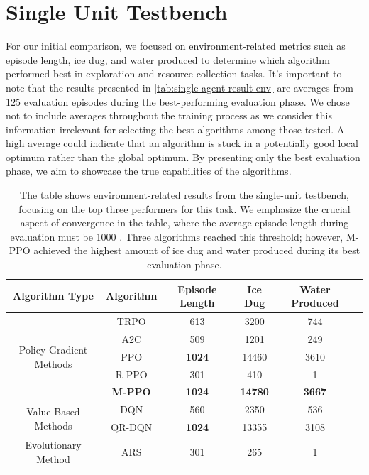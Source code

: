 \section{Single Unit Testbench}
\label{sec:single-unit-testbench-results}

\noindent For our initial comparison, we focused on environment-related metrics such as episode length, ice dug, and water produced to determine which algorithm performed best in exploration and resource collection tasks. It's important to note that the results presented in \textcolor{deepblue}{\autoref{tab:single-agent-result-env}} are averages from $125$ evaluation episodes during the best-performing evaluation phase. We chose not to include averages throughout the training process as we consider this information irrelevant for selecting the best algorithms among those tested. A high average could indicate that an algorithm is stuck in a potentially good local optimum rather than the global optimum. By presenting only the best evaluation phase, we aim to showcase the true capabilities of the algorithms.

\bigskip

\begin{table}[htbp]
    \centering
    \begin{tabular}{|c|c|c|c|c|c|}
        \hline
        \textbf{Algorithm Type} & \textbf{Algorithm} & \textbf{Episode Length} & \textbf{Ice Dug} & \textbf{Water Produced}\\
        \hline
        \multirow{5}{*}{Policy Gradient Methods} & TRPO  & 613  &  3200  & 744 \\
        \cline{2-5}
         & A2C & 509 &  1201  &  249\\
        \cline{2-5}
         & PPO & \textbf{1024}  & 14460  & 3610\\
        \cline{2-5}
         & R-P\textbf{}PO  & 301  & 410  & 1\\
        \cline{2-5}
         & \textbf{M-PPO}  & \textbf{1024} &  \textbf{14780} &  \textbf{3667}\\
        \hline
        \multirow{2}{*}{Value-Based Methods} & DQN & 560  & 2350  &  536\\
        \cline{2-5}
         & QR-DQN & \textbf{1024}  &  13355 &  3108 \\
        \hline
        Evolutionary Method & ARS & 301 &  265 &  1\\
        \hline
    \end{tabular}
    \captionsetup{justification=justified, singlelinecheck=false, width=1\linewidth, labelfont=bf} 
    \caption{The table shows environment-related results from the single-unit testbench, focusing on the top three performers for this task. We emphasize the crucial aspect of convergence in the table, where the average episode length during evaluation must be 1000 \protect \footnotemark. Three algorithms reached this threshold; however, M-PPO achieved the highest amount of ice dug and water produced during its best evaluation phase.}
    \label{tab:single-agent-result-env}
\end{table}

